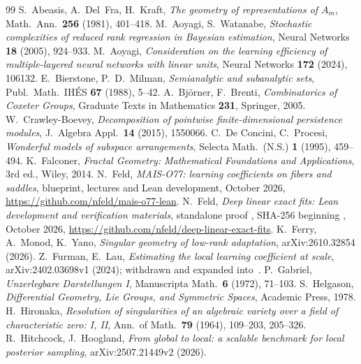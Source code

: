 \documentclass[11pt,a4paper]{article}
\theoremstyle{definition}
\theoremstyle{remark}
\numberwithin{equation}{section}
\begin{document}
\begin{thebibliography}{99}
 S.~Abeasis, A.~Del~Fra, H.~Kraft, \emph{The geometry of representations of $A_m$}, Math.\ Ann.\ \textbf{256} (1981), 401--418.
 M.~Aoyagi, S.~Watanabe, \emph{Stochastic complexities of reduced rank regression in Bayesian estimation}, Neural Networks \textbf{18} (2005), 924--933.
 M.~Aoyagi, \emph{Consideration on the learning efficiency of multiple-layered neural networks with linear units}, Neural Networks \textbf{172} (2024), 106132.
 E.~Bierstone, P.~D.~Milman, \emph{Semianalytic and subanalytic sets}, Publ.\ Math.\ IHÉS \textbf{67} (1988), 5--42.
 A.~Björner, F.~Brenti, \emph{Combinatorics of Coxeter Groups}, Graduate Texts in Mathematics \textbf{231}, Springer, 2005.
 W.~Crawley-Boevey, \emph{Decomposition of pointwise finite-dimensional persistence modules}, J.\ Algebra Appl.\ \textbf{14} (2015), 1550066.
 C.~De Concini, C.~Procesi, \emph{Wonderful models of subspace arrangements}, Selecta Math.\ (N.S.) \textbf{1} (1995), 459--494.
 K.~Falconer, \emph{Fractal Geometry: Mathematical Foundations and Applications}, 3rd ed., Wiley, 2014.
 N.~Feld, \emph{MAIS-O77: learning coefficients on fibers and saddles}, blueprint, lectures and Lean development, October 2026, \url{https://github.com/nfeld/mais-o77-lean}.
 N.~Feld, \emph{Deep linear exact fits: Lean development and verification materials}, standalone proof , SHA-256 beginning , October 2026, \url{https://github.com/nfeld/deep-linear-exact-fits}.
 K.~Ferry, A.~Monod, K.~Yano, \emph{Singular geometry of low-rank adaptation}, arXiv:2610.32854 (2026).
 Z.~Furman, E.~Lau, \emph{Estimating the local learning coefficient at scale}, arXiv:2402.03698v1 (2024); withdrawn and expanded into~\cite{lau-llc}.
 P.~Gabriel, \emph{Unzerlegbare Darstellungen I}, Manuscripta Math.\ \textbf{6} (1972), 71--103.
 S.~Helgason, \emph{Differential Geometry, Lie Groups, and Symmetric Spaces}, Academic Press, 1978.
 H.~Hironaka, \emph{Resolution of singularities of an algebraic variety over a field of characteristic zero: I, II}, Ann.\ of Math.\ \textbf{79} (1964), 109--203, 205--326.
 R.~Hitchcock, J.~Hoogland, \emph{From global to local: a scalable benchmark for local posterior sampling}, arXiv:2507.21449v2 (2026).

\end{thebibliography}
\end{document}
